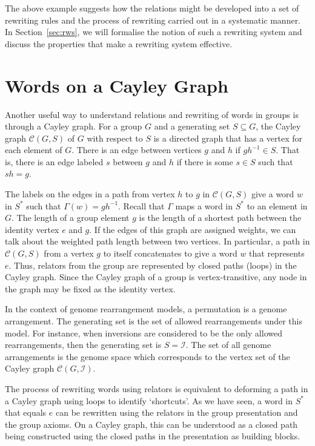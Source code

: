 \documentclass[12pt,a4paper]{amsart}
\newcommand{\invset}{\mathcal{I}}
\newcommand{\id}{e}
\newcommand{\cayley}{\mathcal{C}}
\numberwithin{equation}{section}
\begin{document}
The above example suggests how the relations might be developed into a set of rewriting rules and the process of rewriting carried out in a systematic manner.  
In Section~\ref{sec:rws}, we will formalise the notion of such a rewriting system and discuss the properties that make a rewriting system effective.

\section{Words on a Cayley Graph}\label{sec:cg}


Another useful way to understand relations and rewriting of words in groups is through a Cayley graph. For a group $G$ and a generating set $S \subseteq G$, the Cayley graph $\cayley(G,S)$ of $G$ with respect to $S$ is a directed graph that has a vertex for each element of $G$.  There is an edge between vertices $g$ and $h$ if $gh^{-1} \in S$. That is, there is an edge labeled $s$ between $g$ and $h$ if there is some $s \in S$ such that $sh = g$. 

The labels on the edges in a path from vertex $h$ to $g$ in $\cayley(G,S)$ give a word $w$ in $S^*$ such that $\Gamma(w) = gh^{-1}$. Recall that $\Gamma$ maps a word in $S^*$ to an element in $G$. The length of a group element $g$ is the length of a shortest path between the identity vertex $\id$ and $g$. If the edges of this graph are assigned weights, we can talk about the weighted path length between two vertices. 
In particular, a path in $\cayley(G,S)$ from a vertex $g$ to itself concatenates to give a word $w$ that represents $\id$.
Thus, relators from the group are represented by closed paths (loops) in the Cayley graph.
Since the Cayley graph of a group is vertex-transitive, any node in the graph may be fixed as the identity vertex.


In the context of genome rearrangement models, a permutation is a genome arrangement. The generating set is the set of allowed rearrangements under this model. For instance, when inversions are considered to be the only allowed rearrangements, then the generating set is $S=\invset$. The set of all genome arrangements is the genome space which corresponds to the vertex set of the Cayley graph $\cayley(G, \invset)$. 


The process of rewriting words using relators is equivalent to deforming a path in a Cayley graph using loops to identify `shortcuts'. As we have seen, a word in $S^*$ that equals $\id$ can be rewritten using the relators in the group presentation and the group axioms. On a Cayley graph, this can be understood as a closed path being constructed using the closed paths in the presentation as building blocks.
\end{document}
